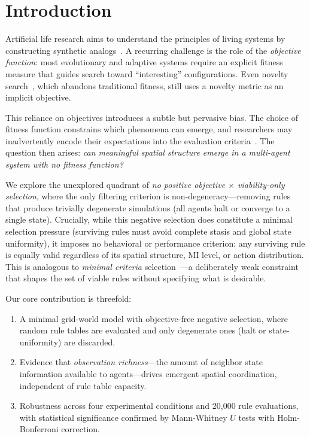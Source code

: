 \documentclass[letterpaper]{article}
\begin{document}
\section{Introduction}

Artificial life research aims to understand the principles of living systems
by constructing synthetic analogs~\citep{bedau2003artificial}. A recurring
challenge is the role of the \emph{objective function}: most evolutionary and
adaptive systems require an explicit fitness measure that guides search toward
``interesting'' configurations. Even novelty search~\citep{lehman2011abandoning},
which abandons traditional fitness, still uses a novelty metric as an implicit
objective.

This reliance on objectives introduces a subtle but pervasive bias. The choice
of fitness function constrains which phenomena can emerge, and researchers may
inadvertently encode their expectations into the evaluation
criteria~\citep{stanley2019openended}. The question then arises: \emph{can
meaningful spatial structure emerge in a multi-agent system with no fitness
function?}

We explore the unexplored quadrant of \emph{no positive objective $\times$
viability-only selection}, where the only filtering criterion is
non-degeneracy---removing rules that produce trivially degenerate simulations
(all agents halt or converge to a single state). Crucially, while this negative
selection does constitute a minimal selection pressure (surviving rules must
avoid complete stasis and global state uniformity), it imposes no behavioral or
performance criterion: any surviving rule is equally valid regardless of its
spatial structure, MI level, or action distribution. This is analogous to
\emph{minimal criteria} selection~\citep{lehman2011abandoning}---a deliberately
weak constraint that shapes the set of viable rules without specifying what is
desirable.

Our core contribution is threefold:
\begin{enumerate}
  \item A minimal grid-world model with objective-free negative selection,
        where random rule tables are evaluated and only degenerate ones
        (halt or state-uniformity) are discarded.
  \item Evidence that \emph{observation richness}---the amount of neighbor
        state information available to agents---drives emergent spatial
        coordination, independent of rule table capacity.
  \item Robustness across four experimental conditions and 20{,}000 rule
        evaluations, with statistical significance confirmed by Mann-Whitney $U$
        tests with Holm-Bonferroni correction.
\end{enumerate}
\end{document}
